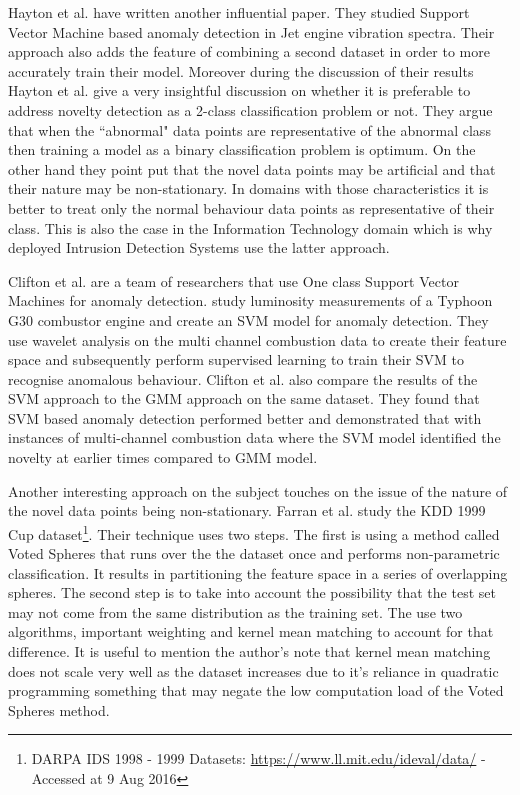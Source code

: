 \documentclass[reqno,openany,12pt]{amsbook}
\begin{document}
Hayton et al.\cite{out3} have written another influential paper. They studied Support Vector Machine based anomaly detection in Jet engine vibration spectra. Their approach also adds the feature of combining a second dataset in order to more accurately train their model. Moreover during the discussion of their results Hayton et al. give a very insightful discussion
on whether it is preferable to address novelty detection as a 2-class classification problem or not. They argue that when the ``abnormal" data points are representative of the abnormal class then training a model as a binary classification problem is optimum. On the other hand they point put that the novel data points may be artificial and that their nature may be non-stationary. In domains with those characteristics it is better to treat only the normal behaviour data points as representative of their class. This is also the case in the Information Technology domain which is why deployed Intrusion Detection Systems use the latter approach.



Clifton et al.\cite{out2} are a team of researchers that use One class Support Vector Machines for anomaly detection. study luminosity measurements of a Typhoon G30 combustor engine and create an SVM model
for anomaly detection. They use wavelet analysis on the multi channel combustion data to create their feature space and subsequently perform supervised learning to train their SVM to recognise anomalous behaviour. Clifton et al. also compare the results of the SVM approach to the GMM approach on the same dataset. They found that SVM based anomaly detection performed better and demonstrated that with instances of multi-channel combustion data where the SVM model identified the novelty at earlier times compared to GMM model.

Another interesting approach on the subject touches on the issue of the nature of the novel data points being non-stationary. Farran et al.\cite{out5} study the KDD  1999 Cup dataset\footnote{DARPA IDS 1998 - 1999 Datasets: \url{https://www.ll.mit.edu/ideval/data/} - Accessed at 9 Aug 2016}.
Their technique uses two steps. The first is using a method called Voted Spheres that runs over the the dataset once and performs non-parametric classification. It results in partitioning the feature space in a series of overlapping spheres. The second step is to take into account the possibility that the test set may not come from the same distribution as the training set. The use two algorithms, important weighting and kernel mean matching to account for that difference. It is useful to mention the author's note that kernel mean matching does not scale very well as the dataset increases due to it's reliance in quadratic programming something that may negate the low computation load of the Voted Spheres method.
\end{document}

